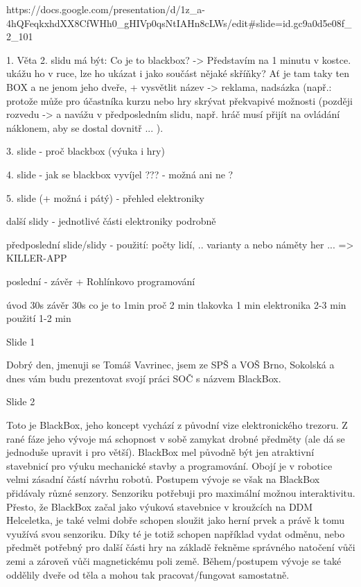 https://docs.google.com/presentation/d/1z_a-4hQFeqkxhdXX8CfWHh0_gHIVp0qsNtIAHn8cLWs/edit#slide=id.gc9a0d5e08f_2_101

1. Věta 2. slidu má být: Co je to blackbox? -> Představím na 1 minutu v kostce.  
ukážu ho v ruce, lze ho ukázat i jako součást nějaké skříňky? Ať je tam taky ten BOX  
a ne jenom jeho dveře, 
+ vysvětlit název -> reklama, nadsázka (např.: protože může pro účastníka kurzu nebo 
hry skrývat překvapivé možnosti (později rozvedu -> a navážu v předposledním slidu, 
např. hráč musí přijít na ovládání náklonem, aby se dostal dovnitř ... ).


3. slide - proč blackbox (výuka i hry)

4. slide - jak se blackbox vyvíjel ??? - možná ani ne ? 

5. slide (+ možná i pátý) - přehled elektroniky 

další slidy - jednotlivé části elektroniky podrobně %


předposlední slide/slidy - použití: počty lidí, .. varianty a nebo náměty her ... => KILLER-APP

poslední - závěr + Rohlínkovo programování  

úvod 30s závěr 30s 
co je to 1min 
proč 2 min 
tlakovka 1 min 
elektronika 2-3 min 
použití 1-2 min 


Slide 1

Dobrý den, jmenuji se Tomáš Vavrinec, jsem ze SPŠ a VOŠ Brno, Sokolská
a dnes vám budu prezentovat svojí práci SOČ s názvem BlackBox.



Slide 2

Toto je BlackBox, jeho koncept vychází z původní vize elektronického trezoru.
Z rané fáze jeho vývoje má schopnost v sobě zamykat drobné předměty (ale dá se jednoduše upravit i pro větší).
BlackBox mel původně být jen atraktivní stavebnicí pro výuku mechanické stavby a programování. Obojí je v robotice 
velmi zásadní částí návrhu robotů.
Postupem vývoje se však na BlackBox přidávaly různé senzory. 
Senzoriku potřebuji pro maximální možnou interaktivitu. Přesto, že BlackBox začal jako výuková stavebnice 
v kroužcích na DDM Helceletka,  %
je také velmi dobře 
schopen sloužit jako herní prvek a právě k tomu využívá svou senzoriku. Díky té je totiž schopen například vydat odměnu, nebo
předmět potřebný pro další části hry na základě řekněme správného natočení vůči zemi a zároveň vůči magnetickému poli země.
Během/postupem vývoje se také oddělily dveře od těla a mohou tak pracovat/fungovat samostatně.

